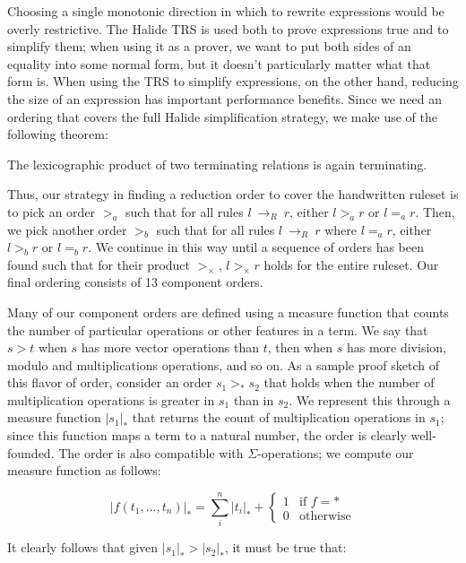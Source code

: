 \documentclass[acmsmall,review]{acmart}\settopmatter{printfolios=true,printccs=false,printacmref=false}
\newcommand{\rewrites}[0]{\:\rightarrow_{R}\:}
\begin{document}
Choosing a single monotonic direction in which to rewrite expressions would be overly restrictive. 
The Halide TRS is used both to prove expressions true and to simplify them; when using it as a prover, we want to put both sides of an equality into some normal form, but it doesn't particularly matter what that form is. When using the TRS to simplify expressions, on the other hand, reducing the size of an expression has important performance benefits. Since we need an ordering that covers the full Halide simplification strategy, we make use of the following theorem:

\begin{theorem}
The lexicographic product of two terminating relations is again terminating.
\end{theorem}

Thus, our strategy in finding a reduction order to cover the handwritten ruleset is to pick an order $>_a$ such that for all rules $l \rewrites r$, either $l >_a r$ or $l =_a r$. Then, we pick another order $>_b$ such that for all rules $l \rewrites r$ where $l =_a r$, either $l >_b r$ or $l =_b r$. We continue in this way until a sequence of orders has been found such that for their product $>_{\times}$, $l >_{\times} r$ holds for the entire ruleset.  Our final ordering consists of 13 component orders.

Many of our component orders are defined using a measure function that counts the number of particular operations or other features in a term. We say that $s > t$ when $s$ has more vector operations than $t$, then when $s$ has more division, modulo and multiplications operations, and so on. As a sample proof sketch of this flavor of order, consider an order $s_1 >_* s_2$ that holds when the number of multiplication operations is greater in $s_1$ than in $s_2$. We represent this through a measure function $|s_1|_*$ that returns the count of multiplication operations in $s_1$; since this function maps a term to a natural number, the order is clearly well-founded. The order is also compatible with $\Sigma$-operations; we compute our measure function as follows:


\[
|f(t_1,...,t_n)|_* = \sum_i^n |t_i|_* + \begin{cases} 1 & \textrm{if } f = * \\
                                                      0 & \textrm{otherwise}
                                        \end{cases}
\]

It clearly follows that given $|s_1|_* > |s_2|_*$, it must be true that:
\end{document}
